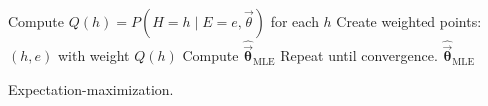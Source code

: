 \begin{algorithm}[ht]
  \begin{algorithmic}
        \State Compute $Q(h) = P(H=h \mid E=e, \vec{\theta})$ for each $h$ %
        \State Create weighted points: $(h,e)$ with weight $Q(h)$
    \EndFor
        \State Compute $\mathbf{\hat{\vec{\theta}}}_{\text{MLE}}$
    \EndFor
    \State Repeat until convergence.
    \State \Return $\mathbf{\hat{\vec{\theta}}}_{\text{MLE}}$
  \EndFunction
  \end{algorithmic}
  \caption{\label{alg:em} Expectation-maximization.}
\end{algorithm}




